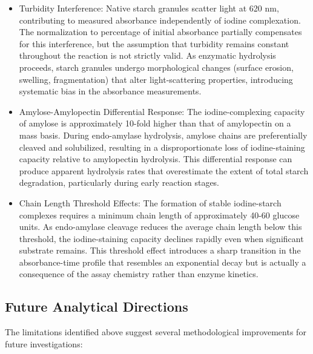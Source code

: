 \documentclass[
  12pt,
]{article}
\begin{document}
\begin{itemize}
\item
  Turbidity Interference: Native starch granules scatter light at 620
  nm, contributing to measured absorbance independently of iodine
  complexation. The normalization to percentage of initial absorbance
  partially compensates for this interference, but the assumption that
  turbidity remains constant throughout the reaction is not strictly
  valid. As enzymatic hydrolysis proceeds, starch granules undergo
  morphological changes (surface erosion, swelling, fragmentation) that
  alter light-scattering properties, introducing systematic bias in the
  absorbance measurements.
\item
  Amylose-Amylopectin Differential Response: The iodine-complexing
  capacity of amylose is approximately 10-fold higher than that of
  amylopectin on a mass basis. During endo-amylase hydrolysis, amylose
  chains are preferentially cleaved and solubilized, resulting in a
  disproportionate loss of iodine-staining capacity relative to
  amylopectin hydrolysis. This differential response can produce
  apparent hydrolysis rates that overestimate the extent of total starch
  degradation, particularly during early reaction stages.
\item
  Chain Length Threshold Effects: The formation of stable iodine-starch
  complexes requires a minimum chain length of approximately 40-60
  glucose units. As endo-amylase cleavage reduces the average chain
  length below this threshold, the iodine-staining capacity declines
  rapidly even when significant substrate remains. This threshold effect
  introduces a sharp transition in the absorbance-time profile that
  resembles an exponential decay but is actually a consequence of the
  assay chemistry rather than enzyme kinetics.
\end{itemize}

\subsection{Future Analytical
Directions}\label{future-analytical-directions}

The limitations identified above suggest several methodological
improvements for future investigations:
\end{document}
